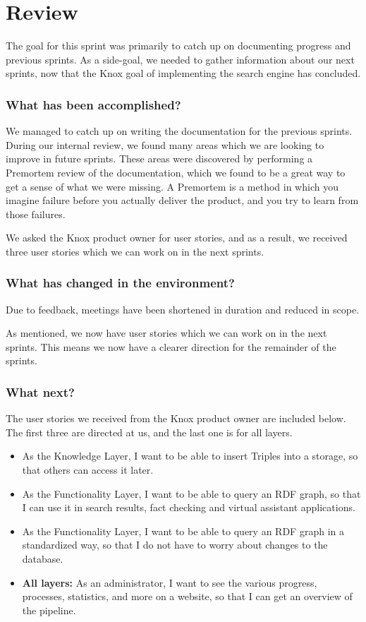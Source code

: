 \section{Review}
The goal for this sprint was primarily to catch up on documenting progress and previous sprints. As a side-goal, we needed to gather information about our next sprints, now that the Knox goal of implementing the search engine has concluded.

\subsubsection*{What has been accomplished?}
We managed to catch up on writing the documentation for the previous sprints. During our internal review, we found many areas which we are looking to improve in future sprints. These areas were discovered by performing a Premortem review of the documentation, which we found to be a great way to get a sense of what we were missing. A Premortem is a method in which you imagine failure before you actually deliver the product, and you try to learn from those failures\cite{PremortemSadanForbedrer}.

We asked the Knox product owner for user stories, and as a result, we received three user stories which we can work on in the next sprints.

\subsubsection*{What has changed in the environment?}
Due to feedback, meetings have been shortened in duration and reduced in scope. 

As mentioned, we now have user stories which we can work on in the next sprints. This means we now have a clearer direction for the remainder of the sprints.

\subsubsection*{What next?}
The user stories we received from the Knox product owner are included below. The first three are directed at us, and the last one is for all \knx{} layers.

\begin{itemize}
    \item As the Knowledge Layer, I want to be able to insert Triples into a storage, so that others can access it later.
    \item As the Functionality Layer, I want to be able to query an RDF graph, so that I can use it in search results, fact checking and virtual assistant applications.
    \item As the Functionality Layer, I want to be able to query an RDF graph in a standardized way, so that I do not have to worry about changes to the database.
    \item \textbf{All layers:} As an administrator, I want to see the various progress, processes, statistics, and more on a website, so that I can get an overview of the pipeline. 
\end{itemize} 

